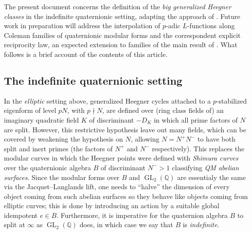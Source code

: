 \documentclass[a4paper]{amsart}
\numberwithin{equation}{section}
\theoremstyle{definition}
\newcommand{\Q}{\mathbb{Q}}
\DeclareMathOperator{\GL}{GL}
\begin{document}
The present document concerns the definition of the \textit{big generalized Heegner classes} in the indefinite quaternionic setting, adapting the approach of \cite{JetchevLoefflerZerbes}. Future work in preparation will address the interpolation of $p$-adic $L$-functions along Coleman families of quaternionic modular forms and the correspondent explicit reciprocity law, an expected extension to families of the main result of \cite{Brooks}. What follows is a brief account of the contents of this article.

\subsection{The indefinite quaternionic setting} In the \textit{elliptic} setting above, generalized Heegner cycles attached to a $p$-stabilized eigenform of level $pN$, with $p\nmid N$, are defined over (ring class fields of) an imaginary quadratic field $K$ of discriminant $-D_K$ in which all prime factors of $N$ are split. However, this restrictive hypothesis leave out many fields, which can be covered by weakening the hypothesis on $N$, allowing $N=N^+N^-$ to have both split and inert primes (the factors of $N^+$ and $N^-$ respectively). This replaces the modular curves in which the Heegner points were defined with \textit{Shimura curves} over the quaternionic algebra $B$ of discriminant $N^->1$ classifying \textit{QM abelian surfaces}. Since the modular forms over $B$ and $\GL_2(\Q)$ are essentialy the same via the Jacquet--Langlands lift, one needs to ``halve'' the dimension of every object coming from such abelian surfaces so they behave like objects coming from elliptic curves; this is done by introducing an action by a suitable global idempotent $e\in B$. Furthermore, it is imperative for the quaternion algebra $B$ to split at $\infty$ as $\GL_2(\Q)$ does, in which case we say that $B$ is \textit{indefinite}.
\end{document}
